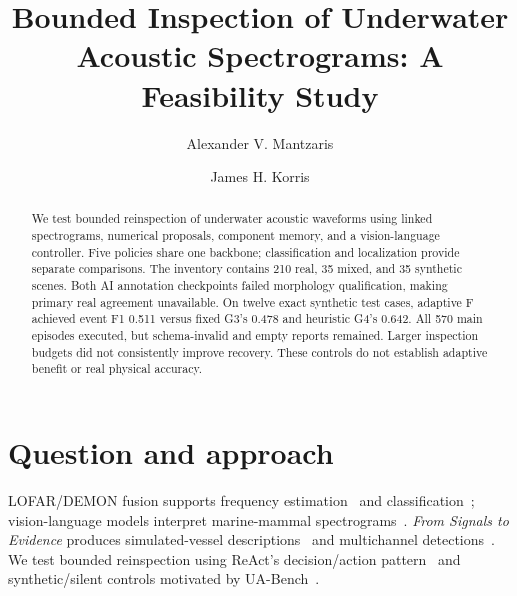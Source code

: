 \documentclass[runningheads,orivec]{llncs}
\begin{document}
\raggedbottom
\renewcommand{\topfraction}{0.9}
\renewcommand{\bottomfraction}{0.9}
\renewcommand{\textfraction}{0.05}
\renewcommand{\floatpagefraction}{0.85}
\title{Bounded Inspection of Underwater Acoustic Spectrograms: A Feasibility Study}
\author{Alexander V. Mantzaris \and James H. Korris}
\maketitle

\begin{abstract}
We test bounded reinspection of underwater acoustic waveforms using linked spectrograms, numerical proposals, component memory, and a vision-language controller. Five policies share one backbone; classification and localization provide separate comparisons. The inventory contains 210 real, 35 mixed, and 35 synthetic scenes. Both AI annotation checkpoints failed morphology qualification, making primary real agreement unavailable. On twelve exact synthetic test cases, adaptive F achieved event F1 0.511 versus fixed G3's 0.478 and heuristic G4's 0.642. All 570 main episodes executed, but schema-invalid and empty reports remained. Larger inspection budgets did not consistently improve recovery. These controls do not establish adaptive benefit or real physical accuracy.
\end{abstract}

\section{Question and approach}
LOFAR/DEMON fusion supports frequency estimation~\cite{li2022lofar} and classification~\cite{najamuddin2026fusion}; vision-language models interpret marine-mammal spectrograms~\cite{nihal2025knowledge}. \emph{From Signals to Evidence} produces simulated-vessel descriptions~\cite{zhang2026evidence1} and multichannel detections~\cite{li2026evidence2}. We test bounded reinspection using ReAct's decision/action pattern~\cite{yao2023react} and synthetic/silent controls motivated by UA-Bench~\cite{sun2026uabench}.
\end{document}
